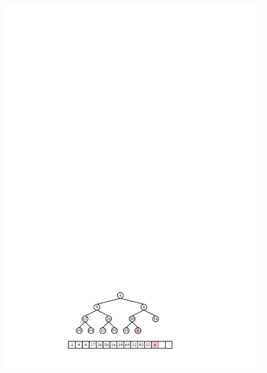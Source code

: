 \begin{figure}
\begin{center}
    \includegraphics[height=\QuarterHeightScaleIfNeeded]{figs/heap-insert-2} \\

\end{center}
\end{figure}
